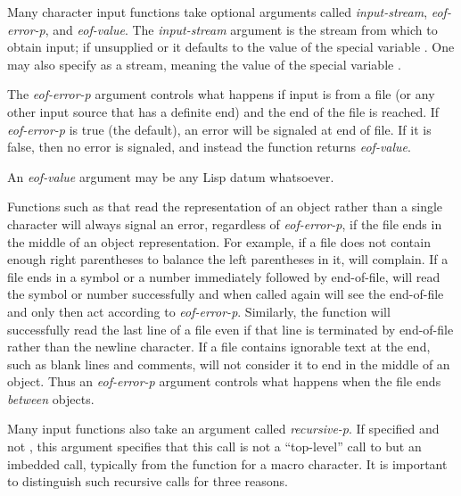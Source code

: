 Many character
input functions take optional arguments called \emph{input-stream},
\emph{eof-error-p}, and \emph{eof-value}.  The \emph{input-stream} argument is the
stream from
which to obtain input; if unsupplied or {\false} it defaults to the value of
the special variable .  One may also specify {\true}
as a stream, meaning the value of the special variable
.

The \emph{eof-error-p} argument
controls what happens if input is from a file (or any other
input source that has a definite end) and the end of the file is reached.
If \emph{eof-error-p} is true (the default), an error will be signaled
at end of file.  If it is false, then no error is signaled, and instead
the function returns \emph{eof-value}.

An \emph{eof-value} argument
may be any Lisp datum whatsoever.

Functions such as  that read the representation
of an object rather than a single
character will always signal an error, regardless of \emph{eof-error-p}, if
the file ends in the middle of an object representation.
For example, if a file does
not contain enough right parentheses to balance the left parentheses in
it,  will complain.  If a file ends in a symbol or a number
immediately followed by end-of-file,  will read the symbol or
number successfully and when called again will see the end-of-file and
only then act according to \emph{eof-error-p}.
Similarly, the function 
will successfully read the last line of a file even if that line
is terminated by end-of-file rather than the newline character.
If a file contains ignorable text at the end, such
as blank lines and comments,  will not consider it to end in the
middle of an object.
Thus an \emph{eof-error-p} argument controls what happens
when the file ends \emph{between} objects.

Many input functions also take an argument called \emph{recursive-p}.
If specified and not {\nil}, this argument specifies that
this call is not a ``top-level'' call to  but an imbedded call,
typically from the function for a macro character.
It is important to distinguish such recursive calls for three reasons.

